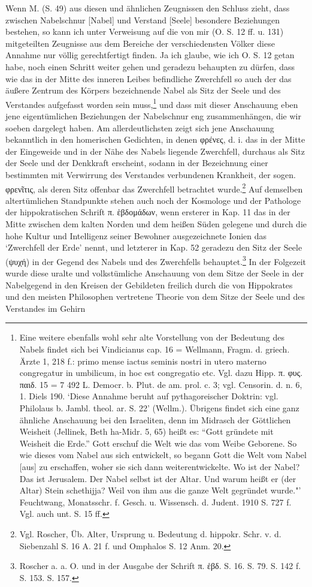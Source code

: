 \documentclass[a4paper, 11pt, oneside]{article}
\begin{document}
Wenn M. (S. 49) aus diesen und ähnlichen Zeugnissen den Schluss zieht, dass zwischen Nabelschnur [Nabel] und Verstand [Seele] besondere Beziehungen bestehen, so kann ich unter Verweisung auf die von mir (O. S. 12 ff. u. 131) mitgeteilten Zeugnisse aus dem Bereiche der verschiedensten Völker diese Annahme nur völlig gerechtfertigt finden. Ja ich glaube, wie ich O. S. 12 getan habe, noch einen Schritt weiter gehen und geradezu behaupten zu dürfen, dass wie das in der Mitte des inneren Leibes befindliche Zwerchfell so auch der das äußere Zentrum des Körpers bezeichnende Nabel als Sitz der Seele und des Verstandes aufgefasst worden sein muss,\footnote{Eine weitere ebenfalls wohl sehr alte Vorstellung von der Bedeutung des Nabels findet sich bei Vindicianus cap. 16 = Wellmann, Fragm. d. griech. Ärzte 1, 218 f.: primo mense iactus seminis nostri in utero materno congregatur in umbilicum, in hoc est congregatio etc. Vgl. dazu Hipp. π. φυς. παιδ. 15 = 7 492 L. Democr. b. Plut. de am. prol. c. 3; vgl. Censorin. d. n. 6, 1. Diels 190. `Diese Annahme beruht auf pythagoreischer Doktrin: vgl. Philolaus b. Jambl. theol. ar. S. 22' (Wellm.). Übrigens findet sich eine ganz ähnliche Anschauung bei den Israeliten, denn im Midrasch der Göttlichen Weisheit (Jellinek, Beth ha-Midr. 5, 65) heißt es: "`Gott gründete mit Weisheit die Erde."' Gott erschuf die Welt wie das vom Weibe Geborene. So wie dieses vom Nabel aus sich entwickelt, so begann Gott die Welt vom Nabel [aus] zu erschaffen, woher sie sich dann weiterentwickelte. Wo ist der Nabel? Das ist Jerusalem. Der Nabel selbst ist der Altar. Und warum heißt er (der Altar) Stein schethijja? Weil von ihm aus die ganze Welt gegründet wurde."' Feuchtwang, Monatsschr. f. Gesch. u. Wissensch. d. Judent. 1910 S. 727 f. Vgl. auch unt. S. 15 ff.} und dass mit dieser Anschauung eben jene eigentümlichen Beziehungen der Nabelschnur eng zusammenhängen, die wir soeben dargelegt haben. Am allerdeutlichsten zeigt sich jene Anschauung bekanntlich in den homerischen Gedichten, in denen φρένες, d. i. das in der Mitte der Eingeweide und in der Nähe des Nabels liegende Zwerchfell, durchaus als Sitz der Seele und der Denkkraft erscheint, sodann in der Bezeichnung einer bestimmten mit Verwirrung des Verstandes verbundenen Krankheit, der sogen. φρενῖτις, als deren Sitz offenbar das Zwerchfell betrachtet wurde.\footnote{Vgl. Roscher, Üb. Alter, Ursprung u. Bedeutung d. hippokr. Schr. v. d. Siebenzahl S. 16 A. 21 f. und Omphalos S. 12 Anm. 20.} Auf demselben altertümlichen Standpunkte stehen auch noch der Kosmologe und der Pathologe der hippokratischen Schrift π. ἑβδομάδων, wenn ersterer in Kap. 11 das in der Mitte zwischen dem kalten Norden und dem heißen Süden gelegene und durch die hohe Kultur und Intelligenz seiner Bewohner ausgezeichnete Ionien das `Zwerchfell der Erde' nennt, und letzterer in Kap. 52 geradezu den Sitz der Seele (ψυχή) in der Gegend des Nabels und des Zwerchfells behauptet.\footnote{Roscher a. a. O. und in der Ausgabe der Schrift π. ἑβδ. S. 16. S. 79. S. 142 f. S. 153. S. 157.} In der Folgezeit wurde diese uralte und volkstümliche Anschauung von dem Sitze der Seele in der Nabelgegend in den Kreisen der Gebildeten freilich durch die von Hippokrates und den meisten Philosophen vertretene Theorie von dem Sitze der Seele und des Verstandes im Gehirn 
\end{document}
